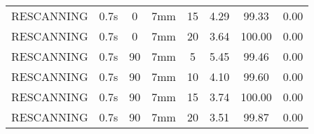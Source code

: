 \begin{table}[H]
\begin{tabular}{|c||c|c|c|c||c|c|c|}
RESCANNING & 0.7s & 0 & 7mm & 15 & 4.29 & 99.33 & 0.00 \\
RESCANNING & 0.7s & 0 & 7mm & 20 & 3.64 & 100.00 & 0.00 \\
RESCANNING & 0.7s & 90 & 7mm & 5 & 5.45 & 99.46 & 0.00 \\
RESCANNING & 0.7s & 90 & 7mm & 10 & 4.10 & 99.60 & 0.00 \\
RESCANNING & 0.7s & 90 & 7mm & 15 & 3.74 & 100.00 & 0.00 \\
RESCANNING & 0.7s & 90 & 7mm & 20 & 3.51 & 99.87 & 0.00 \\
    \hline\hline 
  \end{tabular}
  \label{tab:Pat10_LPV}
\end{table}

\newpage
\thispagestyle{realempty}
\vspace*{-2cm}

